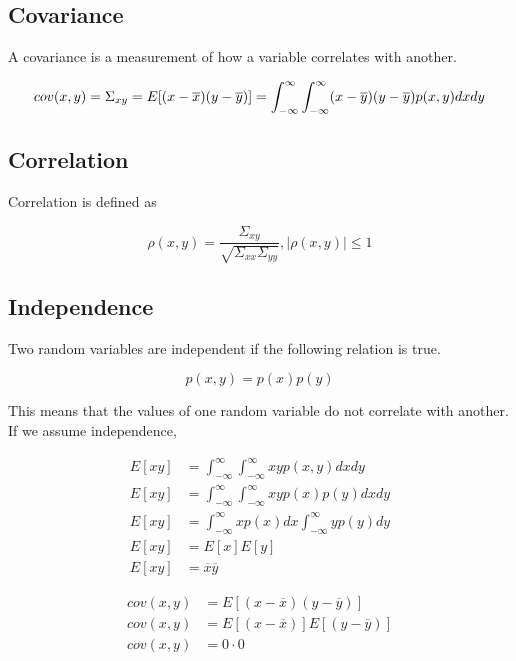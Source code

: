 \subsection{Covariance}

A covariance is a measurement of how a variable correlates with another.

\begin{equation*}
  cov(x, y) = \Sigma_{xy} = E[(x - \overline{x})(y - \overline{y})] =
    \int_{-\infty}^\infty \int_{-\infty}^\infty (x - \overline{y})
    (y - \overline{y}) p(x, y) dx dy \\
\end{equation*}

\subsection{Correlation}

Correlation is defined as

\begin{equation*}
  \rho(x, y) = \frac{\Sigma_{xy}}{\sqrt{\Sigma_{xx}\Sigma_{yy}}}, |\rho(x, y)|
    \leq 1
\end{equation*}

\subsection{Independence}

Two random variables are independent if the following relation is true.

\begin{equation*}
  p(x, y) = p(x)p(y)
\end{equation*}

This means that the values of one random variable do not correlate with another.
If we assume independence,

\begin{align*}
  E[xy] &= \int_{-\infty}^\infty \int_{-\infty}^\infty xy p(x, y) dx dy \\
  E[xy] &= \int_{-\infty}^\infty \int_{-\infty}^\infty xy p(x) p(y) dx dy \\
  E[xy] &= \int_{-\infty}^\infty x p(x) dx \int_{-\infty}^\infty y p(y) dy \\
  E[xy] &= E[x]E[y] \\
  E[xy] &= \overline{x}\overline{y}
\end{align*}

\begin{align*}
  cov(x, y) &= E[(x - \overline{x})(y - \overline{y})] \\
  cov(x, y) &= E[(x - \overline{x})]E[(y - \overline{y})] \\
  cov(x, y) &= 0 \cdot 0 \\
\end{align*}

